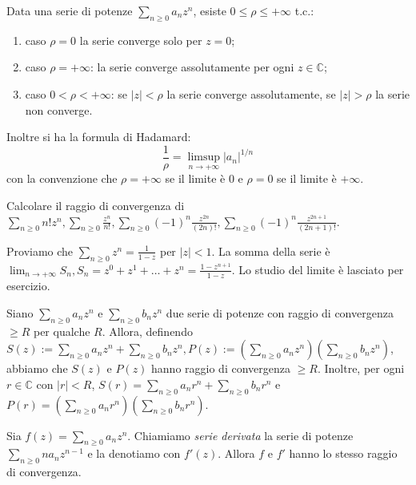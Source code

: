 \begin{prop}
  Data una serie di potenze $\displaystyle \sum_{n \ge 0} a_nz^n$, esiste $0 \le \rho \le +\infty$ t.c.:
  \begin{enumerate}
    \item caso $\rho=0$ la serie converge solo per $z=0$;
    \item caso $\rho=+\infty$: la serie converge assolutamente per ogni $z \in \mathbb{C}$;
    \item caso $0<\rho<+\infty$: se $|z|<\rho$ la serie converge assolutamente, se $|z|>\rho$ la serie non converge.
  \end{enumerate}
  Inoltre si ha la formula di Hadamard:
  $$\frac{1}{\rho}=\limsup_{n \longrightarrow +\infty} |a_n|^{1/n}$$
  con la convenzione che $\rho=+\infty$ se il limite è $0$ e $\rho=0$ se il limite è $+\infty$.
\end{prop}

\begin{exc}
  Calcolare il raggio di convergenza di \\
  $\displaystyle \sum_{n \ge 0} n!z^n, \sum_{n \ge 0} \frac{z^n}{n!}, \sum_{n \ge 0} (-1)^n \frac{z^{2n}}{(2n)!}, \sum_{n \ge 0} (-1)^n \frac{z^{2n+1}}{(2n+1)!}$.
\end{exc}

\begin{ex}
  Proviamo che $\displaystyle \sum_{n \ge 0} z^n=\frac{1}{1-z}$ per $|z|<1$. La somma della serie è $\displaystyle \lim_{n \longrightarrow +\infty}S_n, S_n=z^0+z^1+\dots+z^n=\frac{1-z^{n+1}}{1-z}$. Lo studio del limite è lasciato per esercizio.
\end{ex}

\begin{ftt}
  \begin{nlist}
    \item Siano $\displaystyle \sum_{n \ge 0} a_nz^n$ e $\displaystyle \sum_{n \ge 0} b_nz^n$ due serie di potenze con raggio di convergenza $\ge R$ per qualche $R$.
    Allora, definendo $\displaystyle S(z):=\sum_{n \ge 0} a_nz^n+\sum_{n \ge 0}b_nz^n, P(z):=\left(\sum_{n \ge 0}a_nz^n\right)\left(\sum_{n \ge 0}b_nz^n\right)$, abbiamo che $S(z)$ e $P(z)$ hanno raggio di convergenza $\ge R$.
    Inoltre, per ogni $r \in \mathbb{C}$ con $|r|<R$, $\displaystyle S(r)=\sum_{n \ge 0}a_nr^n+\sum_{n \ge 0} b_nr^n$ e $\displaystyle P(r)=\left(\sum_{n \ge 0}a_nr^n\right)\left(\sum_{n \ge 0}b_nr^n\right)$.
    \item Sia $\displaystyle f(z)=\sum_{n \ge 0} a_nz^n$. Chiamiamo \textit{serie derivata} la serie di potenze $\displaystyle \sum_{n \ge 0} na_nz^{n-1}$ e la denotiamo con $f'(z)$. Allora $f$ e $f'$ hanno lo stesso raggio di convergenza.
  \end{nlist}
\end{ftt}

